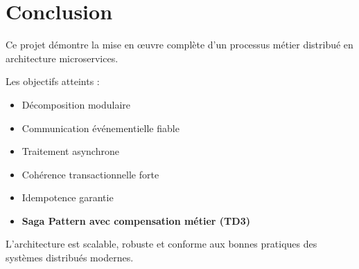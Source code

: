 \documentclass[12pt,a4paper]{article}
\begin{document}
\section{Conclusion}

Ce projet démontre la mise en œuvre complète d'un processus métier distribué en architecture microservices.

Les objectifs atteints :

\begin{itemize}
\item Décomposition modulaire
\item Communication événementielle fiable
\item Traitement asynchrone
\item Cohérence transactionnelle forte
\item Idempotence garantie
\item \textbf{Saga Pattern avec compensation métier (TD3)}
\end{itemize}

L'architecture est scalable, robuste et conforme aux bonnes pratiques des systèmes distribués modernes.
\end{document}
